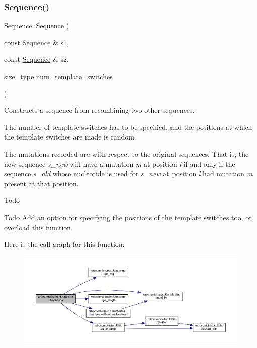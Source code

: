 \subsubsection{\texorpdfstring{Sequence()}{Sequence()}\hspace{0.1cm}{\footnotesize\ttfamily [3/3]}}
{\footnotesize\ttfamily Sequence\+::\+Sequence (\begin{DoxyParamCaption}\item[{const \hyperlink{classretrocombinator_1_1Sequence}{Sequence} \&}]{s1,  }\item[{const \hyperlink{classretrocombinator_1_1Sequence}{Sequence} \&}]{s2,  }\item[{\hyperlink{constants_8h_a8e1541b50cee66a791df4c437ccbb385}{size\+\_\+type}}]{num\+\_\+template\+\_\+switches }\end{DoxyParamCaption})}



Constructs a sequence from recombining two other sequences. 

The number of template switches has to be specified, and the positions at which the template switches are made is random.

The mutations recorded are with respect to the original sequences. That is, the new sequence {\itshape s\+\_\+new} will have a mutation {\itshape m} at position {\itshape l} if and only if the sequence {\itshape s\+\_\+old} whose nucleotide is used for {\itshape s\+\_\+new} at position {\itshape l} had mutation {\itshape m} present at that position.

\begin{DoxyRefDesc}{Todo}
\item[\hyperlink{todo__todo000001}{Todo}]Add an option for specifying the positions of the template switches too, or overload this function. \end{DoxyRefDesc}
Here is the call graph for this function\+:
\nopagebreak
\begin{figure}[H]
\begin{center}
\leavevmode
\includegraphics[width=350pt]{classretrocombinator_1_1Sequence_af334c44bea806196b5037e61b0e831b1_cgraph}
\end{center}
\end{figure}


